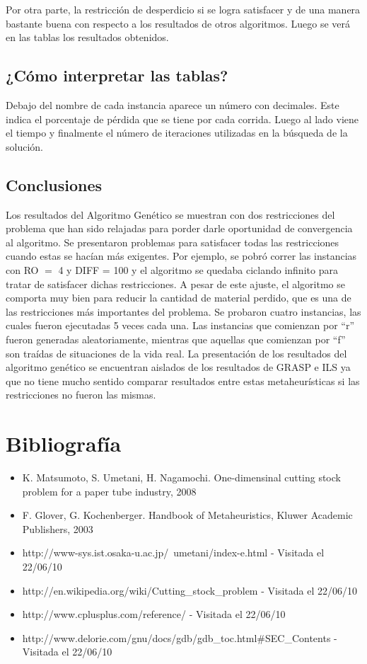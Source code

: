 \documentclass[letter,10pt]{article}
\begin{document}
Por otra parte, la restricción de desperdicio si se logra satisfacer y de una manera bastante buena con respecto a 
los resultados de otros algoritmos. Luego se verá en las tablas los resultados obtenidos.

\subsection{¿Cómo interpretar las tablas?}

Debajo del nombre de cada instancia aparece un número con decimales. Este indica el porcentaje de pérdida que se tiene 
por cada corrida. Luego al lado viene el tiempo y finalmente el número de iteraciones utilizadas en la búsqueda de la 
solución. 

\subsection{Conclusiones}

Los resultados del Algoritmo Genético se muestran con dos restricciones del problema que han sido relajadas para porder
darle oportunidad de convergencia al algoritmo. Se presentaron problemas para satisfacer todas las restricciones cuando 
estas se hacían más exigentes. Por ejemplo, se pobró correr las instancias con RO $=$ 4 y DIFF = 100 y el algoritmo se 
quedaba ciclando infinito para tratar de satisfacer dichas restricciones. A pesar de este ajuste, el algoritmo se comporta 
muy bien para reducir la cantidad de material perdido, que es una de las restricciones más importantes del problema. 
Se probaron cuatro instancias, las cuales fueron ejecutadas 5 veces cada una. Las instancias que comienzan por ``r'' fueron 
generadas aleatoriamente, mientras que aquellas que comienzan por ``f'' son traídas de situaciones de la vida real.
La presentación de los resultados del algoritmo genético se encuentran aislados de los resultados de GRASP e ILS ya que no 
tiene mucho sentido comparar resultados entre estas metaheurísticas si las restricciones no fueron las mismas. 

\newpage
\section{Bibliograf\'ia}
\begin{itemize}
 \item K. Matsumoto, S. Umetani, H. Nagamochi. One-dimensinal cutting stock problem for a paper tube industry, 2008
 \item F. Glover, G. Kochenberger. Handbook of Metaheuristics, Kluwer Academic Publishers, 2003
 \item http://www-sys.ist.osaka-u.ac.jp/~umetani/index-e.html - Visitada el 22/06/10
 \item http://en.wikipedia.org/wiki/Cutting\_stock\_problem - Visitada el 22/06/10
 \item http://www.cplusplus.com/reference/ - Visitada el 22/06/10
 \item http://www.delorie.com/gnu/docs/gdb/gdb\_toc.html\#SEC\_Contents - Visitada el 22/06/10
\end{itemize}
\end{document}
